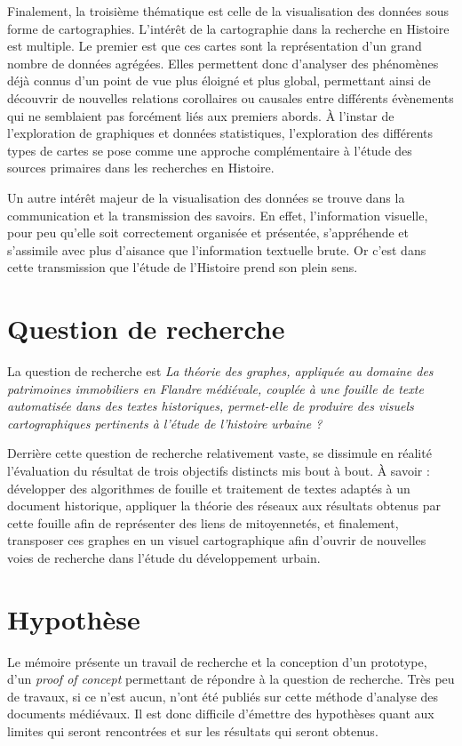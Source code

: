 Finalement, la troisième thématique est celle de la visualisation des données sous forme de cartographies. L’intérêt de la cartographie dans la recherche en Histoire est multiple. Le premier est que ces cartes sont la représentation d’un grand nombre de données agrégées. Elles permettent donc d’analyser des phénomènes déjà connus d’un point de vue plus éloigné et plus global, permettant ainsi de découvrir de nouvelles relations corollaires ou causales entre différents évènements qui ne semblaient pas forcément liés aux premiers abords. À l’instar de l’exploration de graphiques et données statistiques, l’exploration des différents types de cartes se pose comme une approche complémentaire à l’étude des sources primaires dans les recherches en Histoire.

Un autre intérêt majeur de la visualisation des données se trouve dans la communication et la transmission des savoirs. En effet, l’information visuelle, pour peu qu’elle soit correctement organisée et présentée, s’appréhende et s’assimile avec plus d’aisance que l’information textuelle brute. Or c’est dans cette transmission que l’étude de l’Histoire prend son plein sens.

\section{Question de recherche}
 La question de recherche est \emph{\og La théorie des graphes, appliquée au domaine des patrimoines immobiliers en Flandre médiévale, couplée à une fouille de texte automatisée dans des textes historiques, permet-elle de produire des visuels cartographiques pertinents à l’étude de l’histoire urbaine ?\fg{}} 
 
 Derrière cette question de recherche relativement vaste, se dissimule en réalité l'évaluation du résultat de trois objectifs distincts mis bout à bout. À savoir : développer des algorithmes de fouille et traitement de textes adaptés à un document historique, appliquer la théorie des réseaux aux résultats obtenus par cette fouille afin de représenter des liens de mitoyennetés, et finalement, transposer ces graphes en un visuel cartographique afin d'ouvrir de nouvelles voies de recherche dans l'étude du développement urbain.
 
\section{Hypothèse}
Le mémoire présente un travail de recherche et la conception d'un prototype, d'un \textit{proof of concept} permettant de répondre à la question de recherche. Très peu de travaux, si ce n'est aucun, n'ont été publiés sur cette méthode d'analyse des documents médiévaux. Il est donc difficile d'émettre des hypothèses quant aux limites qui seront rencontrées et sur les résultats qui seront obtenus.

